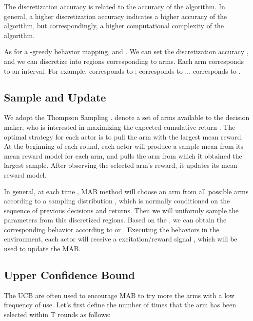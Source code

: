 \begin{Remark}
    The discretization accuracy   is related to the accuracy of the algorithm. In general, a higher discretization accuracy indicates a higher accuracy of the algorithm, but correspondingly, a higher computational complexity of the algorithm.
\end{Remark}

\begin{Example}
    As for a -greedy behavior mapping,  and . We can set the discretization accuracy , and we can discretize  into  regions corresponding to  arms. Each arm corresponds to an interval. For example,  corresponds to ;  corresponds to ... corresponds to .
\end{Example}





\subsection{Sample and Update} 

We adopt the Thompson Sampling \citep{garivier2008upper}.  denote a set of arms available to the decision maker, who is interested in maximizing the expected cumulative return \citep{agent57,DvD}. The optimal strategy for each actor is to pull the arm with the largest mean reward. At the beginning of each round, each actor will produce a sample mean from its mean reward model for each arm, and pulls the arm from which it obtained the largest sample. After observing the selected arm's reward, it updates its mean reward model.


In general, at each time , MAB method will choose an arm  from all possible arms  according to a sampling distribution , which is normally conditioned on the sequence of previous decisions and returns. Then we will uniformly sample the parameters  from this discretized regions.  Based on the , we can obtain the corresponding behavior according to  or . Executing the behaviors in the environment, each actor will receive a excitation/reward signal  , which will be used to update the MAB.




\subsection{Upper Confidence Bound}

The UCB \citep{garivier2008upper} are often used to encourage MAB to try more the arms with a low frequency of use. Let's first define the number of times that the arm  has been selected within T rounds as follows:



